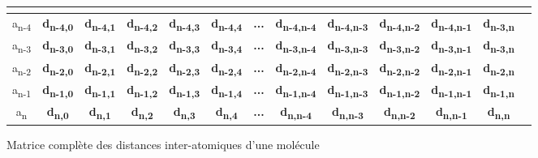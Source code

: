 \begin{figure}[h!]
\begin{tabular}{c|c|c|c|c|c|c|c|c|c|c|c|c}
		\rot{... } & \textbf{\rot{... }} & \textbf{\rot{... }} & \textbf{\rot{... }} & \textbf{\rot{... }} & 
		\textbf{\rot{... }} & \textbf{\halfrot{ ... }} & \textbf{\rot{... }} & \textbf{\rot{... }} & \textbf{\rot{... }} & 
		\textbf{\rot{... }} & \textbf{\rot{... }} \\ \hline


		a\textsubscript{n-4} & \textbf{d\textsubscript{n-4,0}} & \textbf{d\textsubscript{n-4,1}} & \textbf{d\textsubscript{n-4,2}} & 
			\textbf{d\textsubscript{n-4,3}} & \textbf{d\textsubscript{n-4,4}} & \textbf{...} & \textbf{d\textsubscript{n-4,n-4}} & 
			\textbf{d\textsubscript{n-4,n-3}} & \textbf{d\textsubscript{n-4,n-2}} & \textbf{d\textsubscript{n-4,n-1}} & 
			\textbf{d\textsubscript{n-3,n}} \\ \hline

		a\textsubscript{n-3} & \textbf{d\textsubscript{n-3,0}} & \textbf{d\textsubscript{n-3,1}} & \textbf{d\textsubscript{n-3,2}} & 
			\textbf{d\textsubscript{n-3,3}} & \textbf{d\textsubscript{n-3,4}} & \textbf{...} & \textbf{d\textsubscript{n-3,n-4}} & 
			\textbf{d\textsubscript{n-3,n-3}} & \textbf{d\textsubscript{n-3,n-2}} & \textbf{d\textsubscript{n-3,n-1}} & 
			\textbf{d\textsubscript{n-3,n}} \\ \hline
		a\textsubscript{n-2} & \textbf{d\textsubscript{n-2,0}} & \textbf{d\textsubscript{n-2,1}} & \textbf{d\textsubscript{n-2,2}} & 
			\textbf{d\textsubscript{n-2,3}} & \textbf{d\textsubscript{n-2,4}} & \textbf{...} & \textbf{d\textsubscript{n-2,n-4}} & 
			\textbf{d\textsubscript{n-2,n-3}} & \textbf{d\textsubscript{n-2,n-2}} & \textbf{d\textsubscript{n-2,n-1}} & 
			\textbf{d\textsubscript{n-2,n}} \\ \hline
		a\textsubscript{n-1} & \textbf{d\textsubscript{n-1,0}} & \textbf{d\textsubscript{n-1,1}} & \textbf{d\textsubscript{n-1,2}} & 
			\textbf{d\textsubscript{n-1,3}} & \textbf{d\textsubscript{n-1,4}} & \textbf{...} & \textbf{d\textsubscript{n-1,n-4}} & 
			\textbf{d\textsubscript{n-1,n-3}} & \textbf{d\textsubscript{n-1,n-2}} & \textbf{d\textsubscript{n-1,n-1}} & 
			\textbf{d\textsubscript{n-1,n}} \\ \hline
		a\textsubscript{n} & \textbf{d\textsubscript{n,0}} & \textbf{d\textsubscript{n,1}} & \textbf{d\textsubscript{n,2}} & 
			\textbf{d\textsubscript{n,3}} & \textbf{d\textsubscript{n,4}} & \textbf{...} & \textbf{d\textsubscript{n,n-4}} & 
			\textbf{d\textsubscript{n,n-3}} & \textbf{d\textsubscript{n,n-2}} & \textbf{d\textsubscript{n,n-1}} & 
			\textbf{d\textsubscript{n,n}} \\ \hline
		
	\end{tabular}

	
	\caption{Matrice complète des distances inter-atomiques d'une molécule}
\end{figure}

